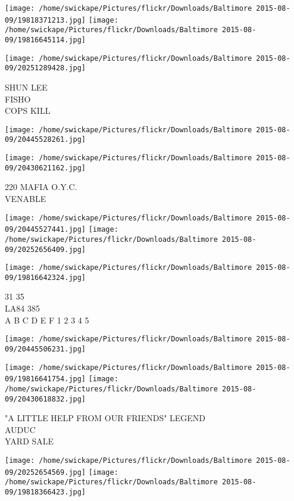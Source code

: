 \documentclass[10pt,letterpaper]{article}
\begin{document}
\texttt{[image: /home/swickape/Pictures/flickr/Downloads/Baltimore 2015-08-09/19818371213.jpg]}
\texttt{[image: /home/swickape/Pictures/flickr/Downloads/Baltimore 2015-08-09/19816645114.jpg]}

\vspace{0.25in}
\texttt{[image: /home/swickape/Pictures/flickr/Downloads/Baltimore 2015-08-09/20251289428.jpg]}

SHUN LEE\\
FISHO\\
COPS KILL
\pagebreak

\texttt{[image: /home/swickape/Pictures/flickr/Downloads/Baltimore 2015-08-09/20445528261.jpg]}

\vspace{0.25in}
\texttt{[image: /home/swickape/Pictures/flickr/Downloads/Baltimore 2015-08-09/20430621162.jpg]}

220 MAFIA O.Y.C.\\
VENABLE
\pagebreak

\texttt{[image: /home/swickape/Pictures/flickr/Downloads/Baltimore 2015-08-09/20445527441.jpg]}
\texttt{[image: /home/swickape/Pictures/flickr/Downloads/Baltimore 2015-08-09/20252656409.jpg]}

\texttt{[image: /home/swickape/Pictures/flickr/Downloads/Baltimore 2015-08-09/19816642324.jpg]}

31 35\\
LA84 385\\
A B C D E F 1 2 3 4 5
\pagebreak

\texttt{[image: /home/swickape/Pictures/flickr/Downloads/Baltimore 2015-08-09/20445506231.jpg]}

\vspace{0.25in}
\texttt{[image: /home/swickape/Pictures/flickr/Downloads/Baltimore 2015-08-09/19816641754.jpg]}
\texttt{[image: /home/swickape/Pictures/flickr/Downloads/Baltimore 2015-08-09/20430618832.jpg]}

"A LITTLE HELP FROM OUR FRIENDS" LEGEND\\
AUDUC\\
YARD SALE
\pagebreak

\texttt{[image: /home/swickape/Pictures/flickr/Downloads/Baltimore 2015-08-09/20252654569.jpg]}
\texttt{[image: /home/swickape/Pictures/flickr/Downloads/Baltimore 2015-08-09/19818366423.jpg]}
\end{document}
